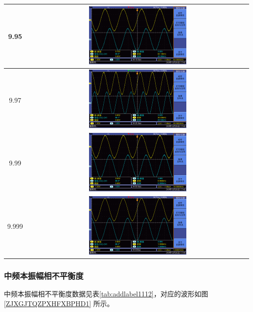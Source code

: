 \documentclass[12pt]{article}
\begin{document}
\begin{longtable}{|c|c|}
    \hline
    9.95 &  \includegraphics[width=0.45\textwidth]{data3/new/F0004TEK}\\
    \hline
    9.97 &  \includegraphics[width=0.45\textwidth]{data3/new/F0005TEK}\\
    \hline
    9.99 & \includegraphics[width=0.45\textwidth]{data3/new/F0006TEK} \\
    \hline
    9.999 & \includegraphics[width=0.45\textwidth]{data3/new/F0007TEK} \\
\end{longtable}
\subsubsection{中频本振幅相不平衡度}
中频本振幅相不平衡度数据见表\ref{tab:addlabel1112}，对应的波形如图\ref{ZJXGJTQZPXHFXBPHD1}
所示。
\end{document}
